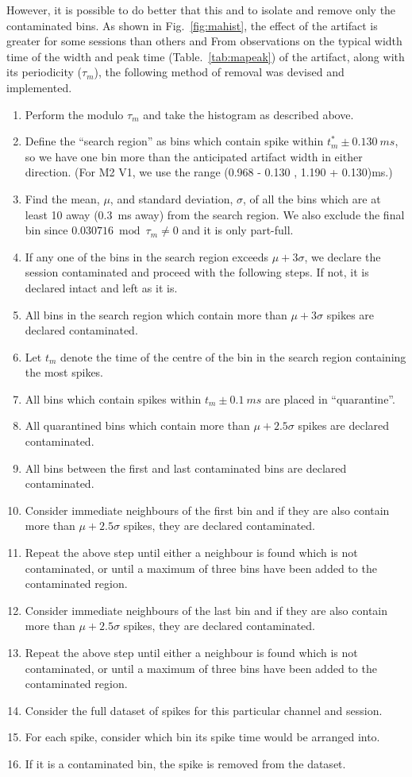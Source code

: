However, it is possible to do better that this and to isolate and remove only the contaminated bins.
As shown in Fig.~\ref{fig:mahist}, the effect of the artifact is greater for some sessions than others and
From observations on the typical width time of the width and peak time (Table.~\ref{tab:mapeak}) of the artifact, along with its periodicity ($\tau_m$), the following method of removal was devised and implemented.
\begin{enumerate}
\item Perform the modulo $\tau_m$ and take the histogram as described above.
\item Define the ``search region'' as bins which contain spike within $t^*_m \pm \SI{0.130}{ms}$, so we have one bin more than the anticipated artifact width in either direction.
      (For \ac{M2} \ac{V1}, we use the range (0.968 - 0.130 , 1.190 + 0.130)\si{\milli\second}.)
\item Find the mean, $\mu$, and standard deviation, $\sigma$, of all the bins which are at least 10 away (\SI{0.3}{ms} away) from the search region.
      We also exclude the final bin since $0.030716 \bmod \tau_m \neq 0$ and it is only part-full.
\item If any one of the bins in the search region exceeds $\mu + 3 \sigma$, we declare the session contaminated and proceed with the following steps.
      If not, it is declared intact and left as it is.
\item All bins in the search region which contain more than $\mu + 3 \sigma$ spikes are declared contaminated.
\item Let $t_m$ denote the time of the centre of the bin in the search region containing the most spikes.
\item All bins which contain spikes within $t_m \pm \SI{0.1}{ms}$ are placed in ``quarantine''.
\item All quarantined bins which contain more than $\mu + 2.5 \sigma$ spikes are declared contaminated.
\item All bins between the first and last contaminated bins are declared contaminated.
\item Consider immediate neighbours of the first bin and if they are also contain more than $\mu + 2.5 \sigma$ spikes, they are declared contaminated.
\item Repeat the above step until either a neighbour is found which is not contaminated, or until a maximum of three bins have been added to the contaminated region.
\item Consider immediate neighbours of the last bin and if they are also contain more than $\mu + 2.5 \sigma$ spikes, they are declared contaminated.
\item Repeat the above step until either a neighbour is found which is not contaminated, or until a maximum of three bins have been added to the contaminated region.
\item Consider the full dataset of spikes for this particular channel and session.
\item For each spike, consider which bin its spike time would be arranged into.
\item If it is a contaminated bin, the spike is removed from the dataset.
\end{enumerate}

